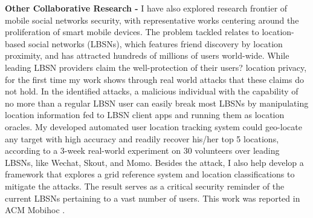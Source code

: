 \documentclass[11pt]{article}
\begin{document}
\textbf{Other Collaborative Research -} I have also explored research frontier of mobile social networks security, with representative works centering around the proliferation of smart mobile devices. The problem tackled relates to location-based social networks (LBSNs), which features friend discovery by location proximity, and has attracted hundreds of millions of users world-wide. While leading LBSN providers claim the well-protection of their users? location privacy, for the first time my work shows through real world attacks that these claims do not hold. In the identified attacks, a malicious individual with the capability of no more than a regular LBSN user can easily break most LBSNs by manipulating location information fed to LBSN client apps and running them as location oracles. My developed automated user location tracking system could geo-locate any target with high accuracy and readily recover his/her top 5 locations, according to a 3-week real-world experiment on 30 volunteers over leading LBSNs, like Wechat, Skout, and Momo. Besides the attack, I also help develop a framework that explores a grid reference system and location classifications to mitigate the attacks. The result serves as a critical security reminder of the current LBSNs pertaining to a vast number of users. This work was reported in ACM Mobihoc \cite{mobihoc}. 


\end{document}

